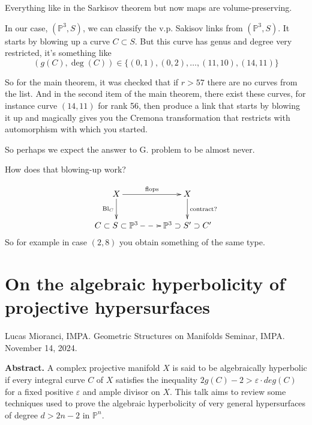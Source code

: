 \begin{theorem}\leavevmode
	Everything like in the Sarkisov theorem but
	now maps are volume-preserving.
\end{theorem}

In our case, $(\mathbb{P}^3,S)$, we can
classify the v.p. Sakisov links from
$(\mathbb{P}^3,S)$. It starts by blowing up a
curve $C\subset S$. But this curve has genus
and degree very restricted, it's something
like
$$
(g(C),\operatorname{deg}(C))\in
\{(0,1),(0,2),\ldots,(11,10),(14,11)\}
$$

So for the main theorem, it was checked that
if $r>57$ there are no curves from the list.
And in the second item of the main theorem,
there exist these curves, for instance curve
$(14,11)$ for rank 56, then produce a link
that starts by blowing it up and magically
gives you the Cremona transformation that
restricts with automorphism with which you
started.

\begin{remark}
	So perhaps we expect the answer to G.
	problem to be almost never.
\end{remark}

\begin{remark}
	How does that blowing-up work?
\end{remark}

$$
\xymatrix{
X\ar[r]^-{\text{flops}}
\ar[d]_-{\operatorname{Bl}_C}
&
X\ar[d]^-{\text{contract?}}
\\
C\subset S\subset
\mathbb{P}^3\ar@{-->}[r]&
\mathbb{P}^3\supset
S'\supset C'
}
$$
So for example in case $(2,8)$ you obtain
something of the same type.

\section{On the algebraic hyperbolicity of
projective hypersurfaces}
\label{section-mioranci-alg-hyperbolicity}

\noindent
Lucas Mioranci, IMPA.
Geometric Structures on Manifolds Seminar,
IMPA.
November 14, 2024.

\medskip\noindent
{\bf Abstract.} A complex projective manifold
$X$ is said to be algebraically hyperbolic if
every integral curve $C$ of $X$ satisfies the
inequality $2g(C)-2>\varepsilon \cdot deg(C)$
for a fixed positive $\varepsilon$ and ample
divisor on $X$. This talk aims to review some
techniques used to prove the algebraic
hyperbolicity of very general hypersurfaces
of degree $d>2n-2$ in $\mathbb{P}^n$.

